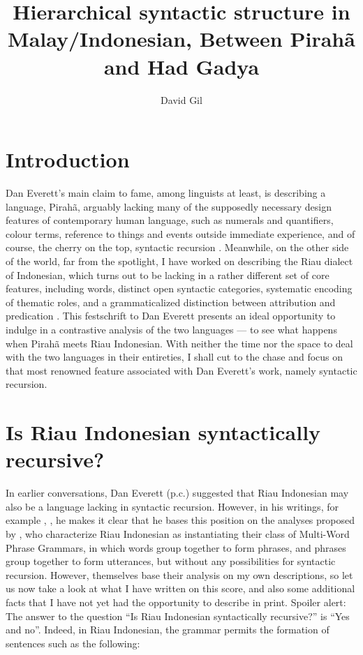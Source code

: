 \documentclass[output=paper,colorlinks,citecolor=brown
]{langscibook}
\author{David Gil\affiliation{Max Planck Institute for Evolutionary Anthropology}}
\title[Hierarchical syntactic structure in Malay/Indonesian]{Hierarchical syntactic structure in Malay/Indonesian,
Between Pirahã and Had Gadya}
\begin{document}
\maketitle

\section{Introduction}
Dan Everett's main claim to fame, among linguists at least, is describing a language, Pirahã, arguably lacking many of the supposedly necessary design features of contemporary human language, such as numerals and quantifiers, colour terms, reference to things and events outside immediate experience, and of course, the cherry on the top, syntactic recursion \citep{everett2005cultural}. Meanwhile, on the other side of the world, far from the spotlight, I have worked on describing the Riau dialect of Indonesian, which turns out to be lacking in a rather different set of core features, including words, distinct open syntactic categories, systematic encoding of thematic roles, and a grammaticalized distinction between attribution and predication \citep{gil2005word,gil2006intonation,gil2012predication,gil2013riau, gil2017isolating, gil2020isolating}. This festschrift to Dan Everett presents an ideal opportunity to indulge in a contrastive analysis of the two languages — to see what happens when Pirahã meets Riau Indonesian. With neither the time nor the space to deal with the two languages in their entireties, I shall cut to the chase and focus on that most renowned feature associated with Dan Everett's work, namely syntactic recursion.

\section{Is Riau Indonesian syntactically recursive?}

In earlier conversations, Dan Everett (p.c.) suggested that Riau Indonesian may also be a language lacking in syntactic recursion. However, in his writings, for example \citet{futrell2016corpus}, \citet{everett2017grammar}, he makes it clear that he bases this position on the analyses proposed by \citet{jackendoff2014syntax, jackendoff2017linear}, who characterize Riau Indonesian as instantiating their class of Multi-Word Phrase Grammars, in which words group together to form phrases, and phrases group together to form utterances, but without any possibilities for syntactic recursion. However, \cite{jackendoff2014syntax, jackendoff2017linear} themselves base their analysis on my own descriptions, so let us now take a look at what I have written on this score, and also some additional facts that I have not yet had the opportunity to describe in print. Spoiler alert: The answer to the question ``Is Riau Indonesian syntactically recursive?'' is ``Yes and no''.
Indeed, in Riau Indonesian, the grammar permits the formation of sentences such as the following:
\end{document}
